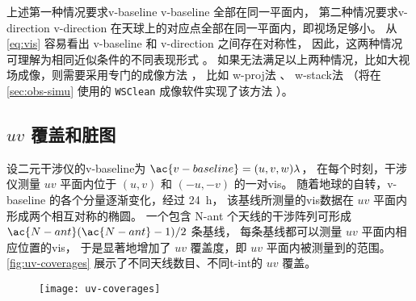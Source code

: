 上述第一种情况要求\acl{v-baseline} \ac{v-baseline} 全部在同一平面内，
第二种情况要求\acl{v-direction} \ac{v-direction}
在天球上的对应点全部在同一平面内，即视场足够小。
从\autoref{eq:vis} 容易看出 \ac{v-baseline} 和 \ac{v-direction} 之间存在对称性，
因此，这两种情况可理解为相同近似条件的不同表现形式 \cite{clark1999}。
如果无法满足以上两种情况，比如大视场成像，则需要采用专门的成像方法
\cite{cornwell1992,sault2007}，
比如 \ac{w-proj}法 \cite{cornwell2008}、
\ac{w-stack}法 \cite{humphreys2011}
（将在 \autoref{sec:obs-simu} 使用的 \texttt{WSClean} 成像软件实现了该方法
\cite{offringa2014,offringa2017}）。

\subsection{\texorpdfstring{$uv$}{uv} 覆盖和脏图}
\label{sec:uv-coverage}

设二元干涉仪的\acl{v-baseline}为 $\ac{v-baseline} = (u,v,w)\lambda$，
在每个时刻，干涉仪测量 $uv$ 平面内位于 $(u,v)$ 和 $(-u,-v)$ 的一对\ac{vis}。
随着地球的自转，\ac{v-baseline} 的各个分量逐渐变化，经过 \SI{24}{\hour}，
该基线所测量的\ac{vis}数据在 $uv$ 平面内形成两个相互对称的椭圆。
一个包含 \ac{N-ant} 个天线的干涉阵列可形成
$\ac{N-ant}(\ac{N-ant}-1)/2$ 条基线，
每条基线都可以测量 $uv$ 平面内相应位置的\ac{vis}，
于是显著地增加了 $uv$ 覆盖度，即 $uv$ 平面内被测量到的范围。
\autoref{fig:uv-coverages} 展示了不同天线数目、不同\ac{t-int}的 $uv$ 覆盖。

\begin{figure}[htp]
  \centering
  \texttt{[image: uv-coverages]}
  \label{fig:uv-coverages}
\end{figure}


